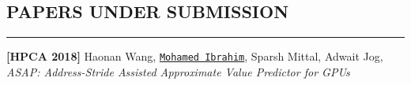 \documentclass[10pt,a4]{article}
\begin{document}
\subsection*{PAPERS UNDER SUBMISSION}
\hrule
\vspace{0.2cm}

\begin{description}
\item 
{\bf [HPCA 2018]}
Haonan Wang, {\tt \underline{Mohamed Ibrahim}}, Sparsh Mittal, Adwait Jog, 
{\it ASAP: Address-Stride Assisted Approximate Value Predictor for GPUs}

\end{description}






\end{document}
